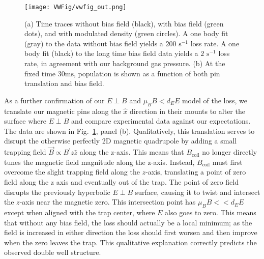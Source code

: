 \documentclass[%
 reprint,
groupedaddress,
 amsmath,amssymb,
 aps,
prl,
]{revtex4-1}
\newcommand{\epb}{{$E\!\perp\!B$}}
\begin{document}
\begin{figure}[tb]
\texttt{[image: VWFig/vwfig\_out.png]}%
\caption{
(a) Time traces without bias field (black), with bias field (green dots), and with modulated density (green circles). A one body fit (gray) to the data without bias field yields a $200\text{ s}^{-1}$ loss rate. A one body fit (black) to the long time bias field data yields a $2\text{ s}^{-1}$ loss rate, in agreement with our background gas pressure. (b) At the fixed time $30 \text{ms}$, population is shown as a function of both pin translation and bias field.
\label{fig:WVplot}}
\end{figure}


As a further confirmation of our \epb{}  and $\mu_BB<d_EE$ model of the loss, we translate our magnetic pins along the $\hat{x}$ direction in their mounts to alter the surface where \epb{}  and compare experimental data against our expectations. The data are shown in Fig.~\ref{fig:WVplot}, panel (b). Qualitatively, this translation serves to disrupt the otherwise perfectly 2D magnetic quadrupole by adding a small trapping field $\vec{B}\propto B^\prime z\hat{z}$ along the z-axis. This means that $B_\text{coil}$ no longer directly tunes the magnetic field magnitude along the z-axis. Instead, $B_\text{coil}$ must first overcome the slight trapping field along the $z$-axis, translating a point of zero field along the z axis and eventually out of the trap. The point of zero field disrupts the previously hyperbolic \epb{} surface, causing it to twist and intersect the $z$-axis near the magnetic zero. This intersection point has $\mu_BB<< d_EE$ except when aligned with the trap center, where $E$ also goes to zero. This means that without any bias field, the loss should actually be a local minimum; as the field is increased in either direction the loss should first worsen and then improve when the zero leaves the trap. This qualitative explanation correctly predicts the observed double well structure.
\end{document}
